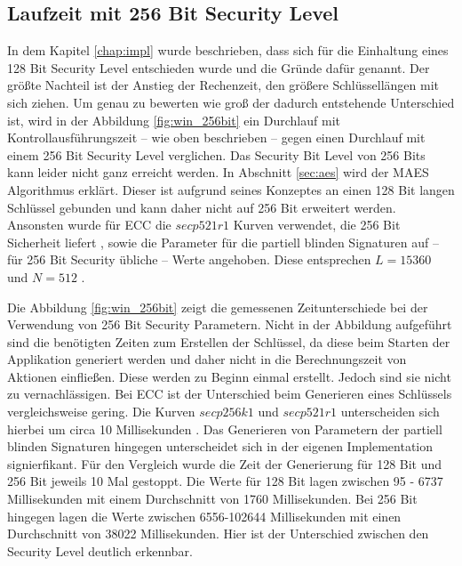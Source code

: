 \documentclass[
	fontsize=12pt,
	headings=small,
	parskip=half,           %
	bibliography=totoc,
	numbers=noenddot,       %
	open=any,               %
]{scrreprt}
\begin{document}
\subsection{Laufzeit mit 256 Bit Security Level}
\label{subsec:runTime256Bit}
In dem Kapitel \ref{chap:impl} wurde beschrieben, dass sich für die Einhaltung eines 128 Bit Security Level entschieden wurde und die Gründe dafür genannt. Der größte Nachteil ist der Anstieg der Rechenzeit, den größere Schlüssellängen mit sich ziehen. Um genau zu bewerten wie groß der dadurch entstehende Unterschied ist, wird in der Abbildung \ref{fig:win_256bit} ein Durchlauf mit Kontrollausführungszeit -- wie oben beschrieben -- gegen einen Durchlauf mit einem 256 Bit Security Level verglichen.
Das Security Bit Level von 256 Bits kann leider nicht ganz erreicht werden. In Abschnitt \ref{sec:aes} wird der MAES Algorithmus erklärt. Dieser ist aufgrund seines Konzeptes an einen 128 Bit langen Schlüssel gebunden und kann daher nicht auf 256 Bit erweitert werden. Ansonsten wurde für ECC die $secp521r1$ Kurven verwendet, die 256 Bit Sicherheit liefert \cite{ecc-duka2020elliptic}, sowie die Parameter für die partiell blinden Signaturen auf -- für 256 Bit Security übliche -- Werte angehoben. Diese entsprechen $L=15360$ und $N=512$ \cite{elaine2016recommendation}.

Die Abbildung \ref{fig:win_256bit} zeigt die gemessenen Zeitunterschiede bei der Verwendung von 256 Bit Security Parametern. Nicht in der Abbildung aufgeführt sind die benötigten Zeiten zum Erstellen der Schlüssel, da diese beim Starten der Applikation generiert werden und daher nicht in die Berechnungszeit von Aktionen einfließen. Diese werden zu Beginn einmal erstellt. Jedoch sind sie nicht zu vernachlässigen. Bei ECC ist der Unterschied beim Generieren eines Schlüssels vergleichsweise gering. Die Kurven $secp256k1$ und $secp521r1$ unterscheiden sich hierbei um circa 10 Millisekunden \cite{ecc-duka2020elliptic}. Das Generieren von Parametern der partiell blinden Signaturen hingegen unterscheidet sich in der eigenen Implementation signierfikant. Für den Vergleich wurde die Zeit der Generierung für 128 Bit und 256 Bit jeweils 10 Mal gestoppt. Die Werte für 128 Bit lagen zwischen 95 - 6737 Millisekunden mit einem Durchschnitt von 1760 Millisekunden. Bei 256 Bit hingegen lagen die Werte zwischen 6556-102644 Millisekunden mit einen Durchschnitt von 38022 Millisekunden. Hier ist der Unterschied zwischen den Security Level deutlich erkennbar.
\end{document}
